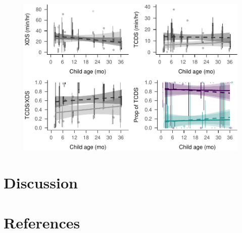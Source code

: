 \documentclass[man]{apa6}
\theoremstyle{definition}
\theoremstyle{definition}
\theoremstyle{definition}
\theoremstyle{remark}
\begin{document}
\begin{figure}
\centering
\includegraphics{Tseltal-CLE_files/figure-latex/plot_XDS_TDS_quantity_nonrandom-1.pdf}
\caption{}
\end{figure}

\section{Discussion}\label{discussion}

\newpage

\section{References}\label{references}

\begingroup
\setlength{\parindent}{-0.5in} \setlength{\leftskip}{0.5in}

\hypertarget{refs}{}

\endgroup
\end{document}
